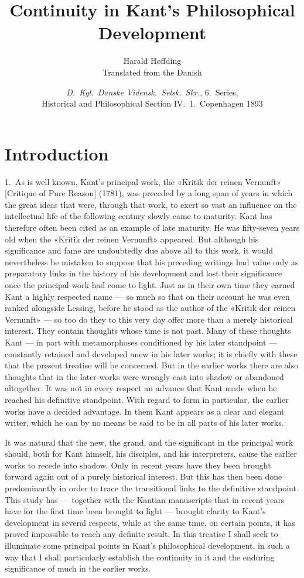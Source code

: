 \documentclass[12pt,a4paper]{article}
\title{\textbf{Continuity in Kant's Philosophical Development}}
\author{Harald Høffding\\[4pt]
  \small Translated from the Danish}
\date{\emph{D.\ Kgl.\ Danske Vidensk.\ Selsk.\ Skr.}, 6.\ Series,\\
  Historical and Philosophical Section IV.\ 1.\ Copenhagen 1893}
\newcommand{\opage}[1]{\marginnote{\footnotesize\textit{[#1]}}}
\begin{document}
\maketitle
\thispagestyle{fancy}

\section*{Introduction}

\noindent \opage{5}1.\ As is well known, Kant's principal work, the «Kritik der
reinen Vernunft» [Critique of Pure Reason] (1781), was preceded by a long
span of years in which the great ideas that were, through that work, to
exert so vast an influence on the intellectual life of the following
century slowly came to maturity. Kant has therefore often been cited as
an example of late maturity. He was fifty-seven years old when the
«Kritik der reinen Vernunft» appeared. But although his significance and
fame are undoubtedly due above all to this work, it would nevertheless be
mistaken to suppose that his preceding writings had value only as
preparatory links in the history of his development and lost their
significance once the principal work had come to light. Just as in their
own time they earned Kant a highly respected name --- so much so that on
their account he was even ranked alongside Lessing, before he stood as the
author of the «Kritik der reinen Vernunft» --- so too do they to this very
day offer more than a merely historical interest. They contain thoughts
whose time is not past. Many of these thoughts Kant --- in part with
metamorphoses conditioned by his later standpoint --- constantly retained
and developed anew in his later works; it is chiefly with these that the
present treatise will be concerned. But in the earlier works there are
also thoughts that in the later works were wrongly cast into shadow or
abandoned altogether. It was not in every respect an advance that Kant
made when he reached his definitive standpoint. With regard to form in
particular, the earlier works have a decided advantage. In them Kant
appears as a clear and elegant writer, which he can by no means be said to
be in all parts of his later works.

It was natural that the new, the grand, and the significant in the
principal work should, both for Kant himself, his disciples, and his
interpreters, cause the earlier works to recede into shadow. Only in
recent years have they been brought forward again out of a purely
historical interest. But this has then been done predominantly in order to
trace the transitional links to the definitive standpoint. This study has
--- together with the Kantian manuscripts that in recent years have for
the first time been brought to light --- brought clarity to Kant's
development in several respects, while at the same time, on certain
points, it has proved \opage{6}impossible to reach any definite result. In this
treatise I shall seek to illuminate some principal points in Kant's
philosophical development, in such a way that I shall particularly
establish the continuity in it and the enduring significance of much in
the earlier works.
\end{document}
